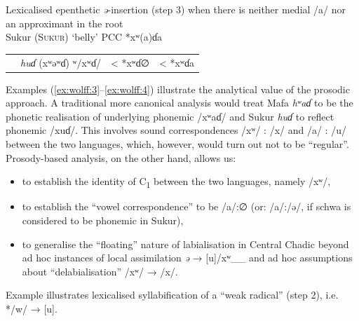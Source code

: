 \documentclass[output=paper]{langscibook}
\begin{document}
\z


 \ea
 \label{ex:wolff:4} Lexicalised epenthetic \textit{ə}-insertion (step 3) when there is neither medial \mbox{/a/} nor an approximant in the root\\
Sukur (\textsc{Sukur}) ‘belly’   PCC *xʷ(a)ɗa
\begin{tabular}{llll}
 & \textit{huɗ} (xʷəʷɗ) ʷ/xʷɗ/ & < *xʷɗ∅ & < *xʷɗa\\
\end{tabular}\noindent

\z

Examples (\ref{ex:wolff:3}--\ref{ex:wolff:4}) illustrate the analytical value of the prosodic approach. A traditional more canonical analysis would treat Mafa \textit{hʷaɗ} to be the phonetic realisation of underlying phonemic /xʷaɗ/ and Sukur \textit{huɗ} to reflect phonemic \mbox{/xuɗ/}. This involves sound correspondences /xʷ/ : /x/ and /a/ : /u/ between the two languages, which, however, would turn out not to be ``regular''. Prosody-based analysis, on the other hand, allows us:

\begin{itemize}
\item to establish the identity of C\textsubscript{1} between the two languages, namely /xʷ/,
\item to establish the ``vowel correspondence'' to be /a/:∅ (or: /a/:/ə/, if schwa is considered to be phonemic in Sukur),
\item to generalise the ``floating'' nature of labialisation in Central Chadic beyond ad hoc instances of local assimilation \textit{ə} → [u]/xʷ\_\_ and ad hoc assumptions about ``delabialisation'' /xʷ/ → /x/.
\end{itemize}

Example  illustrates lexicalised syllabification of a ``weak radical'' (step 2), i.e. */w/ → [u].
\end{document}
